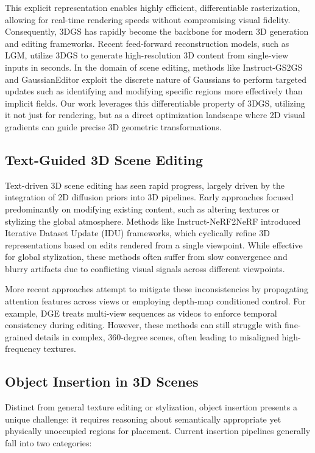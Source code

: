 \documentclass[pdflatex,sn-mathphys-num]{sn-jnl}%
\theoremstyle{thmstyleone}%
\theoremstyle{thmstyletwo}%
\theoremstyle{thmstylethree}%
\begin{document}
This explicit representation enables highly efficient, differentiable rasterization, allowing for real-time rendering speeds without compromising visual fidelity. Consequently, 3DGS has rapidly become the backbone for modern 3D generation and editing frameworks. Recent feed-forward reconstruction models, such as LGM, utilize 3DGS to generate high-resolution 3D content from single-view inputs in seconds. In the domain of scene editing, methods like Instruct-GS2GS and GaussianEditor exploit the discrete nature of Gaussians to perform targeted updates such as identifying and modifying specific regions more effectively than implicit fields. Our work leverages this differentiable property of 3DGS, utilizing it not just for rendering, but as a direct optimization landscape where 2D visual gradients can guide precise 3D geometric transformations.

\subsection{Text-Guided 3D Scene Editing}

Text-driven 3D scene editing has seen rapid progress, largely driven by the integration of 2D diffusion priors into 3D pipelines. Early approaches focused predominantly on modifying existing content, such as altering textures or stylizing the global atmosphere. Methods like Instruct-NeRF2NeRF  introduced Iterative Dataset Update (IDU) frameworks, which cyclically refine 3D representations based on edits rendered from a single viewpoint. While effective for global stylization, these methods often suffer from slow convergence and blurry artifacts due to conflicting visual signals across different viewpoints.

More recent approaches attempt to mitigate these inconsistencies by propagating attention features across views or employing depth-map conditioned control. For example, DGE  treats multi-view sequences as videos to enforce temporal consistency during editing. However, these methods can still struggle with fine-grained details in complex, 360-degree scenes, often leading to misaligned high-frequency textures.

\subsection{Object Insertion in 3D Scenes}

Distinct from general texture editing or stylization, object insertion presents a unique challenge: it requires reasoning about semantically appropriate yet physically unoccupied regions for placement. Current insertion pipelines generally fall into two categories:
\end{document}
